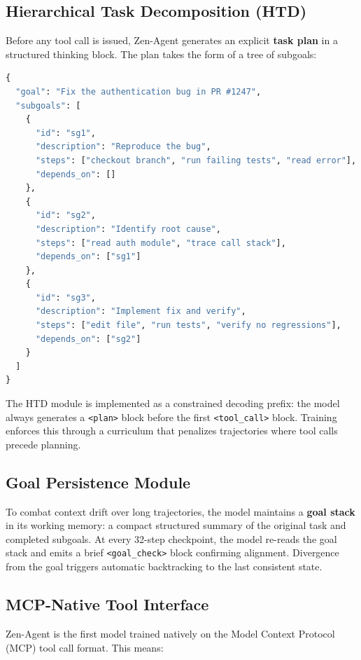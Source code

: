 \documentclass[11pt,a4paper]{article}
\begin{document}
\subsection{Hierarchical Task Decomposition (HTD)}

Before any tool call is issued, Zen-Agent generates an explicit \textbf{task plan} in a
structured thinking block. The plan takes the form of a tree of subgoals:

\begin{lstlisting}[language=Python, caption=HTD Plan Structure]
{
  "goal": "Fix the authentication bug in PR #1247",
  "subgoals": [
    {
      "id": "sg1",
      "description": "Reproduce the bug",
      "steps": ["checkout branch", "run failing tests", "read error"],
      "depends_on": []
    },
    {
      "id": "sg2",
      "description": "Identify root cause",
      "steps": ["read auth module", "trace call stack"],
      "depends_on": ["sg1"]
    },
    {
      "id": "sg3",
      "description": "Implement fix and verify",
      "steps": ["edit file", "run tests", "verify no regressions"],
      "depends_on": ["sg2"]
    }
  ]
}
\end{lstlisting}

The HTD module is implemented as a constrained decoding prefix: the model always generates a
\texttt{<plan>} block before the first \texttt{<tool\_call>} block. Training enforces this
through a curriculum that penalizes trajectories where tool calls precede planning.

\subsection{Goal Persistence Module}

To combat context drift over long trajectories, the model maintains a \textbf{goal stack} in
its working memory: a compact structured summary of the original task and completed subgoals.
At every 32-step checkpoint, the model re-reads the goal stack and emits a brief
\texttt{<goal\_check>} block confirming alignment. Divergence from the goal triggers automatic
backtracking to the last consistent state.

\subsection{MCP-Native Tool Interface}

Zen-Agent is the first model trained natively on the Model Context Protocol (MCP) tool call
format. This means:
\end{document}
